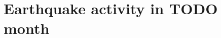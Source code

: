 \documentclass[12pt]{article}
\begin{document}
\newpage

\section*{Earthquake activity in TODO month}%
\label{sec:Earthquake activity in TODO month}




%
%
%
%
%
%
%
%
%
\end{document}
